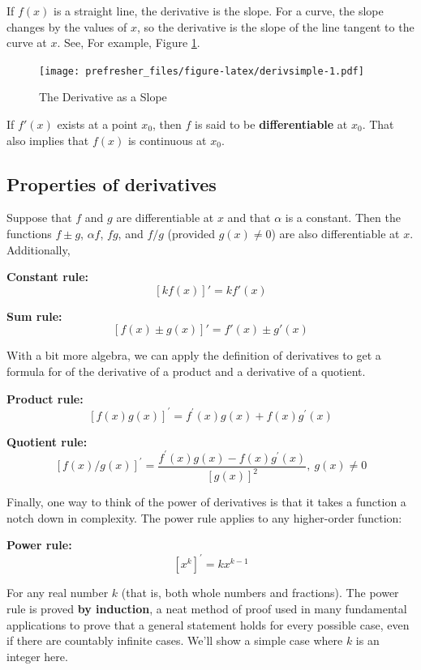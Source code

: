\documentclass[]{book}
\theoremstyle{definition}
\theoremstyle{definition}
\theoremstyle{definition}
\theoremstyle{remark}
\begin{document}
If \(f(x)\) is a straight line, the derivative is the slope. For a
curve, the slope changes by the values of \(x\), so the derivative is
the slope of the line tangent to the curve at \(x\). See, For example,
Figure \ref{fig:derivsimple}.

\begin{figure}
\centering
\texttt{[image: prefresher\_files/figure-latex/derivsimple-1.pdf]}
\caption{\label{fig:derivsimple}The Derivative as a Slope}
\end{figure}

If \(f'(x)\) exists at a point \(x_0\), then \(f\) is said to be
\textbf{differentiable} at \(x_0\). That also implies that \(f(x)\) is
continuous at \(x_0\).

\subsection*{Properties of derivatives}\label{properties-of-derivatives}

Suppose that \(f\) and \(g\) are differentiable at \(x\) and that
\(\alpha\) is a constant. Then the functions \(f\pm g\), \(\alpha f\),
\(f g\), and \(f/g\) (provided \(g(x)\ne 0\)) are also differentiable at
\(x\). Additionally,

\textbf{Constant rule:} \[\left[k f(x)\right]' = k f'(x)\]

\textbf{Sum rule:} \[\left[f(x)\pm g(x)\right]' = f'(x)\pm g'(x)\]

With a bit more algebra, we can apply the definition of derivatives to
get a formula for of the derivative of a product and a derivative of a
quotient.

\textbf{Product rule:}
\[\left[f(x)g(x)\right]^\prime = f^\prime(x)g(x)+f(x)g^\prime(x)\]

\textbf{Quotient rule:}
\[\left[f(x)/g(x)\right]^\prime = \frac{f^\prime(x)g(x) - f(x)g^\prime(x)}{[g(x)]^2}, ~g(x)\neq 0\]

Finally, one way to think of the power of derivatives is that it takes a
function a notch down in complexity. The power rule applies to any
higher-order function:

\textbf{Power rule:} \[\left[x^k\right]^\prime = k x^{k-1}\]

For any real number \(k\) (that is, both whole numbers and fractions).
The power rule is proved \textbf{by induction}, a neat method of proof
used in many fundamental applications to prove that a general statement
holds for every possible case, even if there are countably infinite
cases. We'll show a simple case where \(k\) is an integer here.
\end{document}
